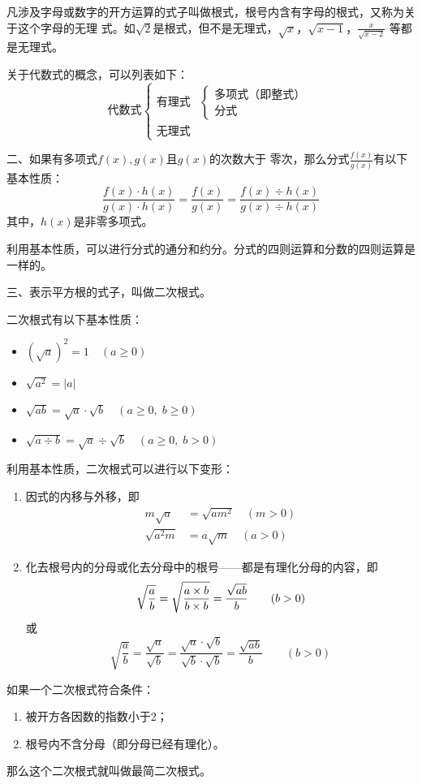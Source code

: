 凡涉及字母或数字的开方运算的式子叫做根式，根号内含有字母的根式，又称为关于这个字母的无理
式。如$\sqrt{2}$是根式，但不是无理式，$\sqrt{x}$，$\sqrt{x-1}$，$\frac{x}{\sqrt{x-2}}$
等都是无理式。

关于代数式的概念，可以列表如下：
\[
\text{代数式}\begin{cases}
    \text{有理式} & \begin{cases}
        \text{多项式（即整式）}\\\text{分式}
    \end{cases}\\
    \text{无理式}
\end{cases}    
\]

二、如果有多项式$f(x),g(x)$且$g(x)$的次数大于
零次，那么分式$\frac{f (x)}{g (x)}$有以下基本性质：
\[\frac{f (x) \cdot h (x)}{g(x)\cdot h(x)}=\frac{f(x)}{g (x)}=\frac{f (x) \div h (x)}{g(x)\div h(x)}\]
其中，$h(x)$是非零多项式。

利用基本性质，可以进行分式的通分和约分。分式的四则运算和分数的四则运算是一样的。

三、表示平方根的式子，叫做二次根式。

二次根式有以下基本性质：
\begin{itemize}
    \item $\left(\sqrt{a}\right)^2=1\quad (a\ge 0)$
    \item $\sqrt{a^2}=|a|$
    \item $\sqrt{ab}=\sqrt{a}\cdot \sqrt{b}\quad (a\ge 0,\; b\ge 0)$
    \item $\sqrt{a\div b}=\sqrt{a}\div \sqrt{b} \quad (a\ge 0,\; b>0)$
\end{itemize}

利用基本性质，二次根式可以进行以下变形：
\begin{enumerate}
    \item 因式的内移与外移，即
    \[\begin{split}
        m\sqrt{a}&=\sqrt{am^2}\quad (m>0)\\
        \sqrt{a^2m}&=a\sqrt{m}\quad (a>0)
    \end{split}\]
    \item 化去根号内的分母或化去分母中的根号——都是有理化分母的内容，即
\[\sqrt{\dfrac{a}{b}}=\sqrt{\dfrac{a\times b}{b\times b}}=\dfrac{\sqrt{ab}}{b}\qquad (b>0)\]
或
\[\sqrt{\frac{a}{b}}=\frac{\sqrt{a}}{\sqrt{b}}=\frac{\sqrt{a}\cdot \sqrt{b}}{\sqrt{b}\cdot \sqrt{b}}=\frac{\sqrt{ab}}{b}\qquad (b>0)\]
\end{enumerate}

如果一个二次根式符合条件：
\begin{enumerate}
    \item 被开方各因数的指数小于2；
    \item 根号内不含分母（即分母已经有理化）。
\end{enumerate}
那么这个二次根式就叫做最简二次根式。


